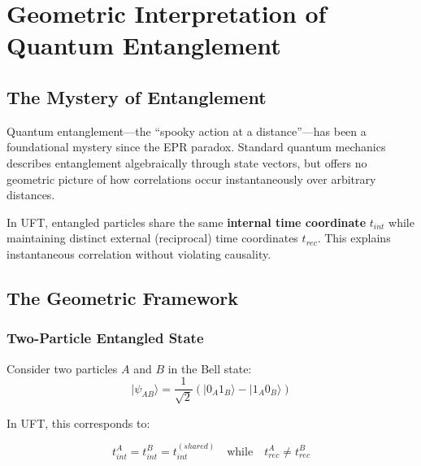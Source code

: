 \section{Geometric Interpretation of Quantum Entanglement}
\label{sec:entanglement_geometry}

\subsection{The Mystery of Entanglement}

Quantum entanglement—the ``spooky action at a distance''—has been a foundational mystery since the EPR paradox. Standard quantum mechanics describes entanglement algebraically through state vectors, but offers no geometric picture of how correlations occur instantaneously over arbitrary distances.

\begin{insight}
In UFT, entangled particles share the same \textbf{internal time coordinate} $t_{int}$ while maintaining distinct external (reciprocal) time coordinates $t_{rec}$. This explains instantaneous correlation without violating causality.
\end{insight}

\subsection{The Geometric Framework}

\subsubsection{Two-Particle Entangled State}

Consider two particles $A$ and $B$ in the Bell state:
\begin{equation}
    |\psi_{AB}\rangle = \frac{1}{\sqrt{2}}(|0_A 1_B\rangle - |1_A 0_B\rangle)
\end{equation}

In UFT, this corresponds to:

\begin{equation}
    t_{int}^A = t_{int}^B = t_{int}^{(shared)}
    \quad \text{while} \quad
    t_{rec}^A \neq t_{rec}^B
\end{equation}

